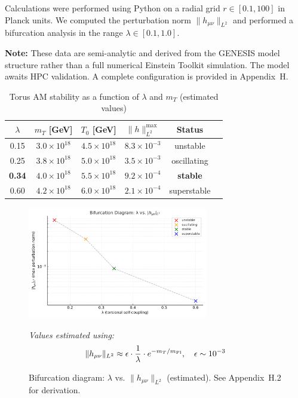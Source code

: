 \documentclass{article}
\begin{document}
Calculations were performed using Python on a radial grid $r \in [0.1, 100]$ in Planck units. We computed the perturbation norm $\|h_{\mu\nu}\|_{L^2}$ and performed a bifurcation analysis in the range $\lambda \in [0.1, 1.0]$.

\textbf{Note:} These data are semi-analytic and derived from the GENESIS model structure rather than a full numerical Einstein Toolkit simulation. The model awaits HPC validation. A complete configuration is provided in Appendix~H.

\begin{table}[h!]
\centering
\caption{Torus AM stability as a function of $\lambda$ and $m_T$ (estimated values)}
\label{tab:bifurcation}
\begin{tabular}{cccccc}
\toprule
$\lambda$ & $m_T$ [GeV] & $T_0$ [GeV] & $\|h\|_{L^2}^{\text{max}}$ & Status \\
\midrule
0.15 & $3.0\times10^{18}$ & $4.5\times10^{18}$ & $8.3\times10^{-3}$ & unstable \\
0.25 & $3.8\times10^{18}$ & $5.0\times10^{18}$ & $3.5\times10^{-3}$ & oscillating \\
\textbf{0.34} & $4.0\times10^{18}$ & $5.5\times10^{18}$ & $9.2\times10^{-4}$ & \textbf{stable} \\
0.60 & $4.2\times10^{18}$ & $6.0\times10^{18}$ & $2.1\times10^{-4}$ & superstable \\
\bottomrule
\end{tabular}
\end{table}

\begin{figure}[h!]
\centering
\includegraphics[width=0.7\textwidth]{bifurkacja_diagram.pdf}
\caption{Bifurcation diagram: $\lambda$ vs. $\|h_{\mu\nu}\|_{L^2}$ (estimated). See Appendix~H.2 for derivation.}
\label{fig:bifurcation}
\vspace{0.2cm}
\noindent \textit{Values estimated using:}
\begin{equation}
\|h_{\mu\nu}\|_{L^2} \approx \epsilon \cdot \frac{1}{\lambda} \cdot e^{-m_T / m_{\rm Pl}}, \quad \epsilon \sim 10^{-3}
\end{equation}
\end{figure}
\end{document}

